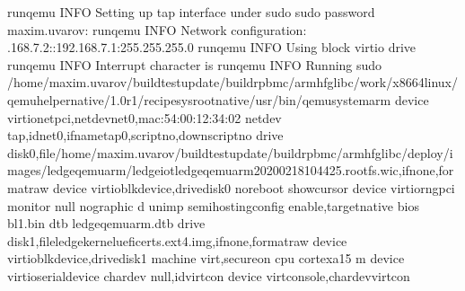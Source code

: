 \documentclass[a4paper,10pt,oneside,english]{sphinxmanual}
\begin{document}
\begin{sphinxVerbatim}[commandchars=\\\{\}]
runqemu \PYGZhy{} INFO \PYGZhy{} Setting up tap interface under sudo
\PYG{o}{[}sudo\PYG{o}{]} password  maxim.uvarov:
runqemu \PYGZhy{} INFO \PYGZhy{} Network configuration: .168.7.2::192.168.7.1:255.255.255.0
runqemu \PYGZhy{} INFO \PYGZhy{} Using block virtio drive
runqemu \PYGZhy{} INFO \PYGZhy{} Interrupt character is \PYG{l+s+s1}{\PYGZsq{}\PYGZca{}]\PYGZsq{}}
runqemu \PYGZhy{} INFO \PYGZhy{} Running sudo /home/maxim.uvarov/build\PYGZhy{}test\PYGZhy{}update/build\PYGZhy{}rpb\PYGZhy{}mc/armhf\PYGZhy{}glibc/work/x86\PYGZus{}64\PYGZhy{}linux/qemu\PYGZhy{}helper\PYGZhy{}native/1.0\PYGZhy{}r1/recipe\PYGZhy{}sysroot\PYGZhy{}native/usr/bin/qemu\PYGZhy{}system\PYGZhy{}arm \PYGZhy{}device virtio\PYGZhy{}net\PYGZhy{}pci,netdevnet0,mac:54:00:12:34:02 \PYGZhy{}netdev tap,idnet0,ifnametap0,scriptno,downscriptno \PYGZhy{}drive disk0,file/home/maxim.uvarov/build\PYGZhy{}test\PYGZhy{}update/build\PYGZhy{}rpb\PYGZhy{}mc/armhf\PYGZhy{}glibc/deploy/images/ledge\PYGZhy{}qemuarm/ledge\PYGZhy{}iot\PYGZhy{}ledge\PYGZhy{}qemuarm\PYGZhy{}20200218104425.rootfs.wic,ifnone,formatraw \PYGZhy{}device virtio\PYGZhy{}blk\PYGZhy{}device,drivedisk0 \PYGZhy{}no\PYGZhy{}reboot \PYGZhy{}show\PYGZhy{}cursor \PYGZhy{}device virtio\PYGZhy{}rng\PYGZhy{}pci \PYGZhy{}monitor null \PYGZhy{}nographic \PYGZhy{}d unimp \PYGZhy{}semihosting\PYGZhy{}config enable,targetnative \PYGZhy{}bios bl1.bin \PYGZhy{}dtb ledge\PYGZhy{}qemuarm.dtb \PYGZhy{}drive disk1,fileledge\PYGZhy{}kernel\PYGZhy{}uefi\PYGZhy{}certs.ext4.img,ifnone,formatraw \PYGZhy{}device virtio\PYGZhy{}blk\PYGZhy{}device,drivedisk1  \PYGZhy{}machine virt,secureon \PYGZhy{}cpu cortex\PYGZhy{}a15 \PYGZhy{}m   \PYGZhy{}device virtio\PYGZhy{}serial\PYGZhy{}device \PYGZhy{}chardev null,idvirtcon \PYGZhy{}device virtconsole,chardevvirtcon


\end{sphinxVerbatim}
\end{document}
